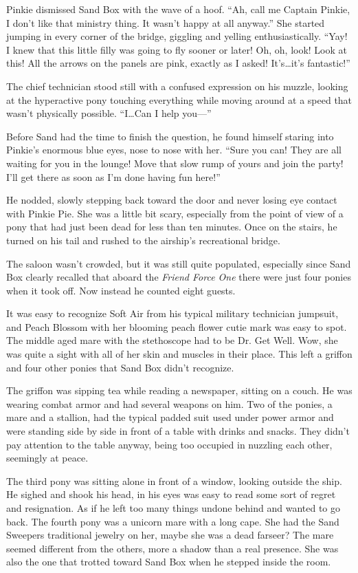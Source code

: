 Pinkie dismissed Sand Box with the wave of a hoof. ``Ah, call me Captain Pinkie, I don't like that ministry thing. It wasn't happy at all anyway.'' She started jumping in every corner of the bridge, giggling and yelling enthusiastically. ``Yay! I knew that this little filly was going to fly sooner or later! Oh, oh, look! Look at this! All the arrows on the panels are pink, exactly as I asked! It's\dots it's fantastic!''

The chief technician stood still with a confused expression on his muzzle, looking at the hyperactive pony touching everything while moving around at a speed that wasn't physically possible. ``I\dots Can I help you---''

Before Sand had the time to finish the question, he found himself staring into Pinkie's enormous blue eyes, nose to nose with her. ``Sure you can! They are all waiting for you in the lounge! Move that slow rump of yours and join the party! I'll get there as soon as I'm done having fun here!''

He nodded, slowly stepping back toward the door and never losing eye contact with Pinkie Pie. She was a little bit scary, especially from the point of view of a pony that had just been dead for less than ten minutes. Once on the stairs, he turned on his tail and rushed to the airship's recreational bridge.

The saloon wasn't crowded, but it was still quite populated, especially since Sand Box clearly recalled that aboard the \emph{Friend Force One} there were just four ponies when it took off. Now instead he counted eight guests.

It was easy to recognize Soft Air from his typical military technician jumpsuit, and Peach Blossom with her blooming peach flower cutie mark was easy to spot. The middle aged mare with the stethoscope had to be Dr. Get Well. Wow, she was quite a sight with all of her skin and muscles in their place. This left a griffon and four other ponies that Sand Box didn't recognize.

The griffon was sipping tea while reading a newspaper, sitting on a couch. He was wearing combat armor and had several weapons on him. Two of the ponies, a mare and a stallion, had the typical padded suit used under power armor and were standing side by side in front of a table with drinks and snacks. They didn't pay attention to the table anyway, being too occupied in nuzzling each other, seemingly at peace.

The third pony was sitting alone in front of a window, looking outside the ship. He sighed and shook his head, in his eyes was easy to read some sort of regret and resignation. As if he left too many things undone behind and wanted to go back. The fourth pony was a unicorn mare with a long cape. She had the Sand Sweepers traditional jewelry on her, maybe she was a dead farseer? The mare seemed different from the others, more a shadow than a real presence. She was also the one that trotted toward Sand Box when he stepped inside the room.

